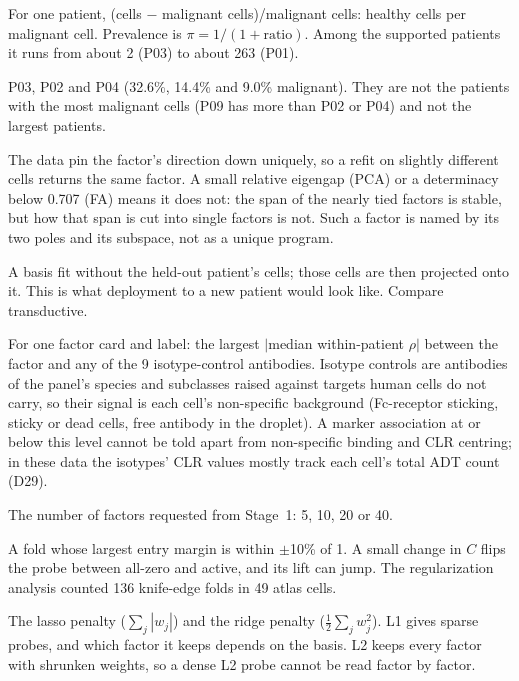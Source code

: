 \begin{description}[leftmargin=0pt,itemsep=3pt,font=\normalfont\bfseries]
\item[Healthy-to-malignant ratio.] For one patient, (cells $-$ malignant cells)/malignant cells: healthy cells per malignant cell. Prevalence is $\pi = 1/(1+\text{ratio})$. Among the supported patients it runs from about 2 (P03) to about 263 (P01).

\item[Highest-prevalence patients.] P03, P02 and P04 (32.6\%, 14.4\% and 9.0\% malignant). They are not the patients with the most malignant cells (P09 has more than P02 or P04) and not the largest patients.

\item[Identifiable (a single factor).] The data pin the factor's direction down uniquely, so a refit on slightly different cells returns the same factor. A small relative eigengap (PCA) or a determinacy below 0.707 (FA) means it does not: the span of the nearly tied factors is stable, but how that span is cut into single factors is not. Such a factor is named by its two poles and its subspace, not as a unique program.

\item[Inductive (Stage~1).] A basis fit without the held-out patient's cells; those cells are then projected onto it. This is what deployment to a new patient would look like. Compare transductive.

\item[Isotype reference.] For one factor card and label: the largest $|$median within-patient $\rho|$ between the factor and any of the 9 isotype-control antibodies. Isotype controls are antibodies of the panel's species and subclasses raised against targets human cells do not carry, so their signal is each cell's non-specific background (Fc-receptor sticking, sticky or dead cells, free antibody in the droplet). A marker association at or below this level cannot be told apart from non-specific binding and CLR centring; in these data the isotypes' CLR values mostly track each cell's total ADT count (D29).

\item[$K$.] The number of factors requested from Stage~1: 5, 10, 20 or 40.

\item[Knife-edge.] A fold whose largest entry margin is within $\pm$10\% of 1. A small change in $C$ flips the probe between all-zero and active, and its lift can jump. The regularization analysis counted 136 knife-edge folds in 49 atlas cells.

\item[L1, L2.] The lasso penalty ($\sum_j|w_j|$) and the ridge penalty ($\tfrac12\sum_j w_j^2$). L1 gives sparse probes, and which factor it keeps depends on the basis. L2 keeps every factor with shrunken weights, so a dense L2 probe cannot be read factor by factor.


\end{description}
